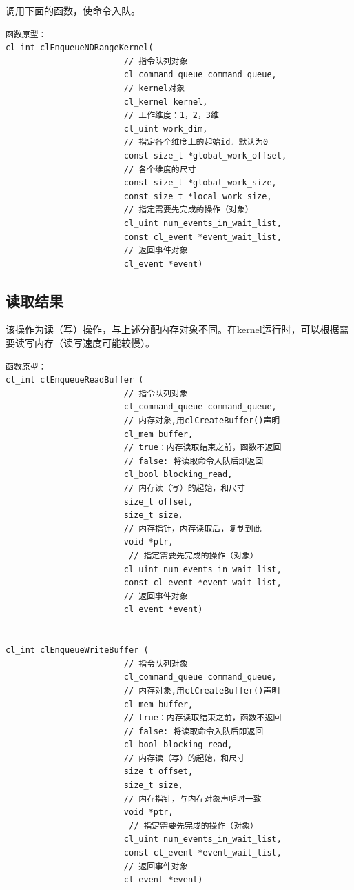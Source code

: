\documentclass{ctexart}
\begin{document}
调用下面的函数，使命令入队。
\begin{verbatim}
函数原型：
cl_int clEnqueueNDRangeKernel(
                        // 指令队列对象
                        cl_command_queue command_queue,
                        // kernel对象
                        cl_kernel kernel,
                        // 工作维度：1，2，3维
                        cl_uint work_dim,
                        // 指定各个维度上的起始id。默认为0
                        const size_t *global_work_offset,
                        // 各个维度的尺寸
                        const size_t *global_work_size,
                        const size_t *local_work_size,
                        // 指定需要先完成的操作（对象）
                        cl_uint num_events_in_wait_list,
                        const cl_event *event_wait_list,
                        // 返回事件对象
                        cl_event *event)
\end{verbatim}



\subsection{读取结果}
该操作为读（写）操作，与上述分配内存对象不同。在kernel运行时，可以根据需要读写内存（读写速度可能较慢）。
\begin{verbatim}
函数原型：
cl_int clEnqueueReadBuffer (
                        // 指令队列对象
                        cl_command_queue command_queue,
                        // 内存对象,用clCreateBuffer()声明
                        cl_mem buffer,
                        // true：内存读取结束之前，函数不返回
                        // false: 将读取命令入队后即返回
                        cl_bool blocking_read,
                        // 内存读（写）的起始，和尺寸
                        size_t offset,
                        size_t size,
                        // 内存指针，内存读取后，复制到此
                        void *ptr,
                         // 指定需要先完成的操作（对象）
                        cl_uint num_events_in_wait_list,
                        const cl_event *event_wait_list,
                        // 返回事件对象
                        cl_event *event)


cl_int clEnqueueWriteBuffer (
                        // 指令队列对象
                        cl_command_queue command_queue,
                        // 内存对象,用clCreateBuffer()声明
                        cl_mem buffer,
                        // true：内存读取结束之前，函数不返回
                        // false: 将读取命令入队后即返回
                        cl_bool blocking_read,
                        // 内存读（写）的起始，和尺寸
                        size_t offset,
                        size_t size,
                        // 内存指针，与内存对象声明时一致
                        void *ptr,
                         // 指定需要先完成的操作（对象）
                        cl_uint num_events_in_wait_list,
                        const cl_event *event_wait_list,
                        // 返回事件对象
                        cl_event *event)
\end{verbatim}
\end{document}
